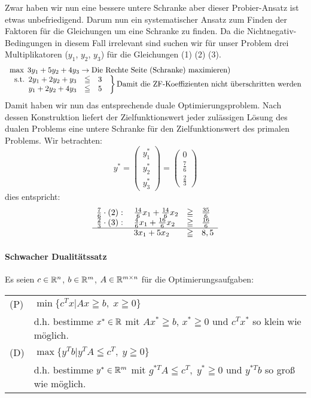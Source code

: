 Zwar haben wir nun eine bessere untere Schranke aber dieser Probier-Ansatz ist
etwas unbefriedigend. Darum nun ein systematischer Ansatz
zum Finden der Faktoren für die Gleichungen um eine Schranke zu finden. Da
die Nichtnegativ-Bedingungen in diesem Fall irrelevant sind suchen wir für
unser Problem drei Multiplikatoren ($y_{1}$, $y_{2}$, $y_{3}$) für die
Gleichungen (1) (2) (3).
\[\begin{array}{l}\max \; 3y_{1} + 5y_{2} + 4y_{3} \rightarrow \mbox{Die Rechte
Seite (Schranke) maximieren)}\\
\left.\begin{array}{l}\mbox{s.t.}\begin{array}[t]{lcl}
2y_{1}+2y_{2}+y_{3} &\leqq & 3 \\
y_{1}+2y_{2}+4y_{3} &\leqq & 5
\end{array} \end{array} \right\}\mbox{Damit die ZF-Koeffizienten nicht
überschritten werden}\end{array}\]
Damit haben wir nun das entsprechende duale Optimierungsproblem. Nach
dessen Konstruktion liefert der Zielfunktionswert jeder zulässigen Lösung
des dualen Problems eine untere Schranke für den Zielfunktionswert des
primalen Problems. Wir betrachten:
\[y^{*}=\left(\begin{array}{c}y^{*}_{1}\\y^{*}_{2}\\y^{*}_{3}\end{array}\right)
=\left(\begin{array}{c}0\\\frac{7}{6}\\\frac{2}{3}\end{array}\right)\] 
dies entspricht:
\[\begin{array}{llcl}
\frac{7}{6} \cdot (2):\; & \frac{14}{6}x_{1} + \frac{14}{6}x_{2} &\geqq&
\frac{35}{6}\\
\frac{2}{3} \cdot (3):\; & \frac{4}{6}x_{1} + \frac{16}{6}x_{2} &\geqq&
\frac{16}{6}\\
\hline
&3x_{1} + 5x_{2} &\geqq& 8,5
\end{array}
\]

\paragraph{Schwacher Dualitätssatz}
Es seien $c \in \mathbb{R}^{n}$, $b \in \mathbb{R}^{m}$, $A \in \mathbb{R}^{m \times n}$ für die
Optimierungsaufgaben:

\begin{tabular}{ll}
(P)&$\min \{c^{T}x | A x \geqq b, \; x\geqq 0\}$\\
&d.h. bestimme $x^{*} \in \mathbb{R}$ mit $A x^{*} \geqq b$, $x^{*} \geqq 0 $ und
$c^{T}x^{*}$ so klein wie möglich.\\
(D)&$\max \{y^{T}b|y^{T}A \leqq c^{T}, \; y \geqq 0\}$\\
&d.h. bestimme  $y^{*} \in \mathbb{R}^{m}$ mit $g^{*T}A \leqq c^{T}, \; y ^{*}
\geqq 0$ und $y^{*T}b$ so groß wie möglich.
\end{tabular}

